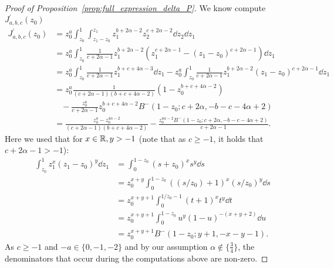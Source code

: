 \begin{proof}[Proof of Proposition~\ref{prop:full_expression_delta_P}]
We know compute $J_{a,b,c}^\prime(z_0)$
\begin{align*}
	J_{a,b,c}^\prime(z_0) 
	&= z_0^a \int_{z_0}^1 \int_{z_1-z_0}^{z_1}  z_1^{b+2\alpha-2} z_2^{c+2\alpha-2} {\dd} z_2 {\dd} z_1  \\
 	&= z_0^a \int_{z_0}^1 \frac{1}{c+2\alpha-1}  z_1^{b+2\alpha-2}( z_1^{c+2\alpha-1}-(z_1-z_0)^{c+2\alpha-1})  {\dd} z_1  \\
 	&=z_0^a \int_{z_0}^1 \frac{1}{c+2\alpha-1} z_1^{b+c+4\alpha-3} {\dd } z_1 -z_0^{a} \int_{z_0}^1 	
 		\frac{1}{c+2\alpha-1}z_1^{b+2\alpha-2}(z_1-z_0)^{c+2\alpha-1}  {\dd} z_1  \\
 	&= z_0^a  \frac{1}{(c+2\alpha-1)(b+c+4\alpha-2)}(1-z_0^{b+c+4\alpha-2}) \\
 	&\hspace{10pt}- \frac{z_0^a}{c+2\alpha-1}z_0^{b+c+4\alpha-2}B^-(1-z_0;c+2\alpha,-b-c-4\alpha+2) \\
	&= \frac{z_0^a -z_0^{4\alpha-2}}{(c+2\alpha-1)(b+c+4\alpha-2)}  
		- \frac{z_0^{4\alpha -2}B^-(1-z_0;c+2\alpha,-b-c-4\alpha+2)}{c+2\alpha-1}.  
\end{align*}
Here we used that for $x  \in {\ensuremath{\mathbb R}},y>-1$ (note that as $c\geq -1$, it holds that $c+2\alpha-1 >-1$):
\begin{align*}
 \int_{z_0}^{1} z_1^x (z_1-z_0)^y {\dd} z_1 
 &= \int_0^{1-z_0} (s+z_0)^x s^y {\dd} s \\
 &= z_0^{x+y} \int_0^{1-z_0} \left( (s/z_0) + 1 \right)^x (s/z_0)^y {\dd} s \\
 &= z_0^{x+y+1} \int_{0}^{1/z_0 -1 } (t+1)^x t^y {\dd} t \\
 &= z_0^{x+y+1} \int_0^{1-z_0} u^y (1-u)^{-(x+y+2)} {\dd} u \\
 &= z_0^{x+y+1} B^-(1-z_0; y+1,-x-y-1 ).
\end{align*}
As $c \geq -1$ and $-a \in \{0,-1,-2\}$ and by our assumption $\alpha \not \in \{\frac{3}{4}\}$, the denominators that occur during the computations above are non-zero. 


\end{proof}
